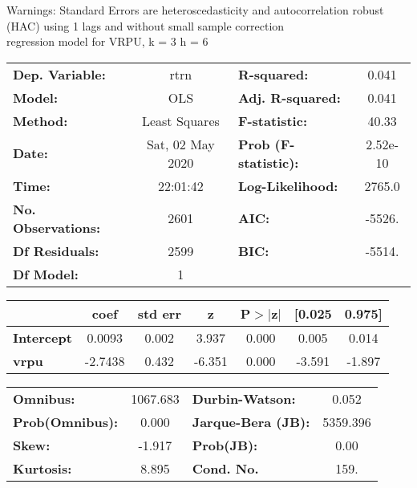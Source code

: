Warnings: \newline
 [1] Standard Errors are heteroscedasticity and autocorrelation robust (HAC) using 1 lags and without small sample correction\\ 

regression model for VRPU, k = 3 h = 6\begin{center}
\begin{tabular}{lclc}
\toprule
\textbf{Dep. Variable:}    &       rtrn       & \textbf{  R-squared:         } &     0.041   \\
\textbf{Model:}            &       OLS        & \textbf{  Adj. R-squared:    } &     0.041   \\
\textbf{Method:}           &  Least Squares   & \textbf{  F-statistic:       } &     40.33   \\
\textbf{Date:}             & Sat, 02 May 2020 & \textbf{  Prob (F-statistic):} &  2.52e-10   \\
\textbf{Time:}             &     22:01:42     & \textbf{  Log-Likelihood:    } &    2765.0   \\
\textbf{No. Observations:} &        2601      & \textbf{  AIC:               } &    -5526.   \\
\textbf{Df Residuals:}     &        2599      & \textbf{  BIC:               } &    -5514.   \\
\textbf{Df Model:}         &           1      & \textbf{                     } &             \\
\bottomrule
\end{tabular}
\begin{tabular}{lcccccc}
                   & \textbf{coef} & \textbf{std err} & \textbf{z} & \textbf{P$> |$z$|$} & \textbf{[0.025} & \textbf{0.975]}  \\
\midrule
\textbf{Intercept} &       0.0093  &        0.002     &     3.937  &         0.000        &        0.005    &        0.014     \\
\textbf{vrpu}      &      -2.7438  &        0.432     &    -6.351  &         0.000        &       -3.591    &       -1.897     \\
\bottomrule
\end{tabular}
\begin{tabular}{lclc}
\textbf{Omnibus:}       & 1067.683 & \textbf{  Durbin-Watson:     } &    0.052  \\
\textbf{Prob(Omnibus):} &   0.000  & \textbf{  Jarque-Bera (JB):  } & 5359.396  \\
\textbf{Skew:}          &  -1.917  & \textbf{  Prob(JB):          } &     0.00  \\
\textbf{Kurtosis:}      &   8.895  & \textbf{  Cond. No.          } &     159.  \\
\bottomrule
\end{tabular}
\end{center}

